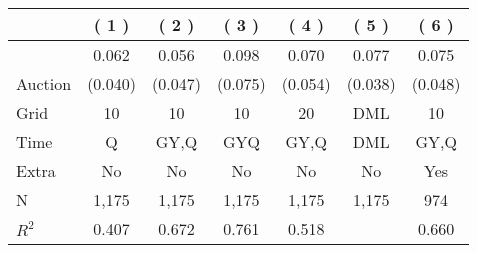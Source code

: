 
\begin{tabular}{lcccccc}
\toprule
 & ( 1 ) & ( 2 ) & ( 3 ) & ( 4 ) & ( 5 ) & ( 6 )\\
\midrule
 & 0.062 & 0.056 & 0.098 & 0.070 & 0.077 & 0.075\\

\multirow{-2}{*}{\raggedright\arraybackslash Auction} & (0.040) & (0.047) & (0.075) & (0.054) & (0.038) & (0.048)\\

\midrule
Grid & 10 & 10 & 10 & 20 & DML & 10\\

Time & Q & GY,Q & GYQ & GY,Q & DML & GY,Q\\

Extra & No & No & No & No & No & Yes\\

N & 1,175 & 1,175 & 1,175 & 1,175 & 1,175 & 974\\

$R^2$ & 0.407 & 0.672 & 0.761 & 0.518 &  & 0.660\\
\bottomrule
\end{tabular}
